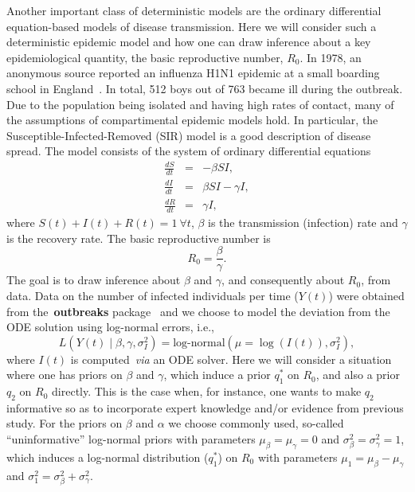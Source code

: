 \documentclass[a4paper, notitlepage, 11pt]{article}
\begin{document}
Another important class of deterministic models are the ordinary differential equation-based models of disease transmission.
Here we will consider such a deterministic epidemic model and how one can draw inference about a key epidemiological quantity, the basic reproductive number, $R_0$.
In 1978, an anonymous source reported an influenza H1N1 epidemic at a small boarding school in England~\citep{Anonymous1978}.
In total, 512 boys out of 763 became ill during the outbreak.
Due to the population being isolated and having high rates of contact, many of the assumptions of compartimental epidemic models hold.
In particular, the Susceptible-Infected-Removed (SIR) model is a good description of disease spread.
The model consists of the system of ordinary differential equations
\begin{eqnarray*}
\frac{dS}{dt}&=& - \beta SI,\\
\frac{dI}{dt}&=&  \beta SI - \gamma I,\\
\frac{dR}{dt}&=& \gamma I, 
\end{eqnarray*} 
where  $S(t) + I(t) + R(t) = 1 \: \forall t$, $\beta$ is the transmission (infection) rate and $\gamma$ is the recovery rate.
The basic reproductive number is 
\begin{equation}
\label{eq:r0def}
R_0 = \frac{\beta}{\gamma}. 
\end{equation}
The goal is to draw inference about $\beta$ and $\gamma$, and consequently about $R_0$, from data.
Data on the number of infected individuals per time ($Y(t)$) were obtained from the~\textbf{outbreaks} package~\citep{Outbreaks2019} and we choose to model the deviation from the ODE solution using log-normal errors, i.e.,
\begin{equation}
 \label{eq:log-normal_likelihood}
 L(Y(t)\mid \beta, \gamma, \sigma_I^2) = \text{log-normal}(\mu =  \log(I(t)), \sigma_I^2),
\end{equation}
where $I(t)$ is computed~\textit{via} an ODE solver.
Here we will consider a situation where one has priors on $\beta$ and $\gamma$, which induce a prior $q_1^\ast$ on $R_0$, and also a prior $q_2$ on $R_0$ directly.
This is the case when, for instance, one wants to make $q_2$ informative so as to incorporate expert knowledge and/or evidence from previous study.
For the priors on $\beta$ and $\alpha$ we choose commonly used, so-called ``uninformative'' log-normal priors with parameters $\mu_{\beta} = \mu_{\gamma} = 0$ and $\sigma_{\beta}^2 = \sigma_{\gamma}^2 = 1$, which induces a log-normal distribution ($q_1^\ast$) on $R_0$ with parameters $\mu_1 = \mu_\beta - \mu_\gamma$ and $\sigma_1^2 = \sigma_{\beta}^2 +  \sigma_{\gamma}^2$.
\end{document}
